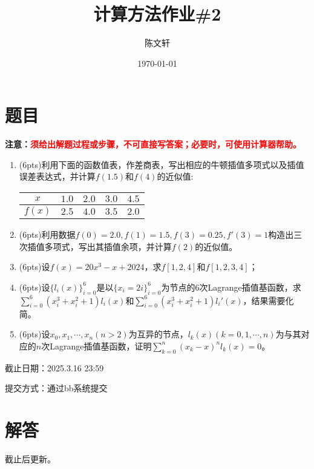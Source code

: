 \documentclass[cn,hazy,green,11pt,normal]{elegantnote}
\title{计算方法作业\#2}
\author{陈文轩}
\institute{KFRC}
\date{\today}
\begin{document}
\maketitle


\section{题目}

    \textbf{注意：\textcolor{red}{须给出解题过程或步骤，不可直接写答案；必要时，可使用计算器帮助。}}

    \begin{enumerate}
        \item (6pts)利用下面的函数值表，作差商表，写出相应的牛顿插值多项式以及插值误差表达式，并计算$f(1.5)$和$f(4)$的近似值:
            \begin{table}[htb]
                \begin{center}
                    \begin{tabular}{|c|c|c|c|c|}
                    \hline
                    $x$ & $1.0$ & $2.0$ & $3.0$ & $4.5$ \\
                    \hline
                    $f(x)$ & $2.5$ & $4.0$ & $3.5$ & $2.0$ \\
                    \hline
                    \end{tabular}
                \end{center}
            \end{table}
        \item (6pts)利用数据$f(0)=2.0,f(1)=1.5,f(3)=0.25,f'(3)=1$构造出三次插值多项式，写出其插值余项，并计算$f(2)$的近似值。
        \item (6pts)设$f(x)=20x^3-x+2024$，求$f[1,2,4]$和$f[1,2,3,4]$；
        \item (6pts)设$\{l_i(x)\}_{i=0}^6$是以$\{x_i=2i\}_{i=0}^6$为节点的$6$次Lagrange插值基函数，求$\sum\limits_{i=0}^6 (x_i^3+x_i^2+1)l_i(x)$和$\sum\limits_{i=0}^6 (x_i^3+x_i^2+1)l_i'(x)$，结果需要化简。
        \item (6pts)设$x_0,x_1,\cdots,x_n(n>2)$为互异的节点，$l_k(x)(k=0,1,\cdots,n)$为与其对应的$n$次Lagrange插值基函数，证明$\sum\limits_{k=0}^n (x_k-x)^n l_k(x)=0$。
    \end{enumerate}

    截止日期：2025.3.16 23:59

    提交方式：通过bb系统提交

\section{解答}

    截止后更新。
\end{document}
